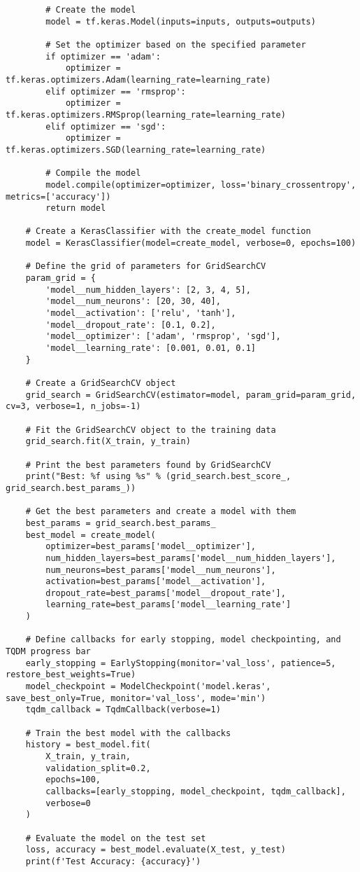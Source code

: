 \begin{lstlisting}
        # Create the model
        model = tf.keras.Model(inputs=inputs, outputs=outputs)
        
        # Set the optimizer based on the specified parameter
        if optimizer == 'adam':
            optimizer = tf.keras.optimizers.Adam(learning_rate=learning_rate)
        elif optimizer == 'rmsprop':
            optimizer = tf.keras.optimizers.RMSprop(learning_rate=learning_rate)
        elif optimizer == 'sgd':
            optimizer = tf.keras.optimizers.SGD(learning_rate=learning_rate)
        
        # Compile the model
        model.compile(optimizer=optimizer, loss='binary_crossentropy', metrics=['accuracy'])
        return model

    # Create a KerasClassifier with the create_model function
    model = KerasClassifier(model=create_model, verbose=0, epochs=100)

    # Define the grid of parameters for GridSearchCV
    param_grid = {
        'model__num_hidden_layers': [2, 3, 4, 5],
        'model__num_neurons': [20, 30, 40],
        'model__activation': ['relu', 'tanh'],
        'model__dropout_rate': [0.1, 0.2],
        'model__optimizer': ['adam', 'rmsprop', 'sgd'],
        'model__learning_rate': [0.001, 0.01, 0.1]
    }

    # Create a GridSearchCV object
    grid_search = GridSearchCV(estimator=model, param_grid=param_grid, cv=3, verbose=1, n_jobs=-1)

    # Fit the GridSearchCV object to the training data
    grid_search.fit(X_train, y_train)

    # Print the best parameters found by GridSearchCV
    print("Best: %f using %s" % (grid_search.best_score_, grid_search.best_params_))

    # Get the best parameters and create a model with them
    best_params = grid_search.best_params_
    best_model = create_model(
        optimizer=best_params['model__optimizer'],
        num_hidden_layers=best_params['model__num_hidden_layers'],
        num_neurons=best_params['model__num_neurons'],
        activation=best_params['model__activation'],
        dropout_rate=best_params['model__dropout_rate'],
        learning_rate=best_params['model__learning_rate']
    )

    # Define callbacks for early stopping, model checkpointing, and TQDM progress bar
    early_stopping = EarlyStopping(monitor='val_loss', patience=5, restore_best_weights=True)
    model_checkpoint = ModelCheckpoint('model.keras', save_best_only=True, monitor='val_loss', mode='min')
    tqdm_callback = TqdmCallback(verbose=1)

    # Train the best model with the callbacks
    history = best_model.fit(
        X_train, y_train,
        validation_split=0.2,
        epochs=100,
        callbacks=[early_stopping, model_checkpoint, tqdm_callback],
        verbose=0
    )

    # Evaluate the model on the test set
    loss, accuracy = best_model.evaluate(X_test, y_test)
    print(f'Test Accuracy: {accuracy}')
\end{lstlisting}

